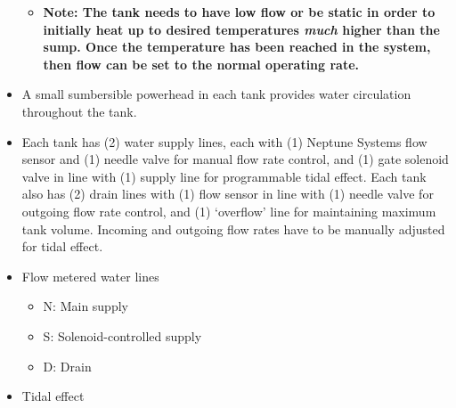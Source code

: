 \documentclass[
]{book}
\providecommand{\tightlist}{%
  \setlength{\itemsep}{0pt}\setlength{\parskip}{0pt}}
\begin{document}
\begin{itemize}
  \begin{itemize}
  \tightlist
  \item
    \textbf{Note: The tank needs to have low flow or be static in order to initially heat up to desired temperatures \emph{much} higher than the sump. Once the temperature has been reached in the system, then flow can be set to the normal operating rate.}\\
  \end{itemize}
\item
  A small sumbersible powerhead in each tank provides water circulation throughout the tank.\\
\item
  Each tank has (2) water supply lines, each with (1) Neptune Systems flow sensor and (1) needle valve for manual flow rate control, and (1) gate solenoid valve in line with (1) supply line for programmable tidal effect. Each tank also has (2) drain lines with (1) flow sensor in line with (1) needle valve for outgoing flow rate control, and (1) `overflow' line for maintaining maximum tank volume. Incoming and outgoing flow rates have to be manually adjusted for tidal effect.\\
\item
  Flow metered water lines

  \begin{itemize}
  \tightlist
  \item
    N: Main supply
  \item
    S: Solenoid-controlled supply
  \item
    D: Drain\\
  \end{itemize}
\item
  Tidal effect


\end{itemize}
\end{document}
